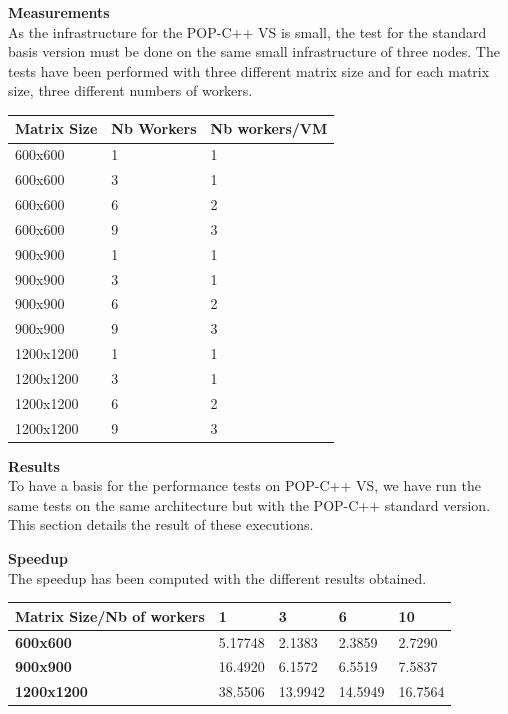 \textbf{Measurements}\\
As the infrastructure for the POP-C++ VS is small, the test for the standard basis version must be done on the same small infrastructure of three nodes. The tests have been performed with three different matrix size and for each matrix size, three different numbers of workers.
\begin{center}
\begin{tabular}{|p{3cm}|p{3cm}|p{3cm}|}
\hline
\textbf{Matrix Size} & \textbf{Nb Workers}	& \textbf{Nb workers/VM} \\ \hline
600x600 & 1 & 1\\ \hline
600x600 & 3 & 1\\ \hline
600x600 & 6 & 2\\ \hline
600x600 & 9 & 3\\ \hline
900x900 & 1 & 1\\ \hline
900x900 & 3 & 1\\ \hline
900x900 & 6 & 2\\ \hline
900x900 & 9 & 3\\ \hline
1200x1200 & 1 & 1\\ \hline
1200x1200 & 3 & 1\\ \hline
1200x1200 & 6 & 2\\ \hline
1200x1200 & 9 & 3\\ \hline
\end{tabular}
\end{center}\s


\textbf{Results}\\
To have a basis for the performance tests on POP-C++ VS, we have run the same tests on the same architecture but with the POP-C++ standard version. This section details the result of these executions. \s

\textbf{Speedup}\\
The speedup has been computed with the different results obtained.
\begin{center}
\begin{tabular}{|p{6cm}|p{2cm}|p{2cm}|p{2cm}|p{2cm}|}
\hline
\textbf{Matrix Size/Nb of workers} & \textbf{1}	& \textbf{3} 	& \textbf{6}	& \textbf{10}\\ \hline
\textbf{600x600} &5.17748 & 2.1383 &	2.3859	& 2.7290 \\ \hline
\textbf{900x900} &16.4920&	6.1572&	6.5519	&7.5837\\ \hline
\textbf{1200x1200} &38.5506 & 13.9942	 & 14.5949 & 16.7564\\ \hline
\end{tabular}
\end{center}\s

